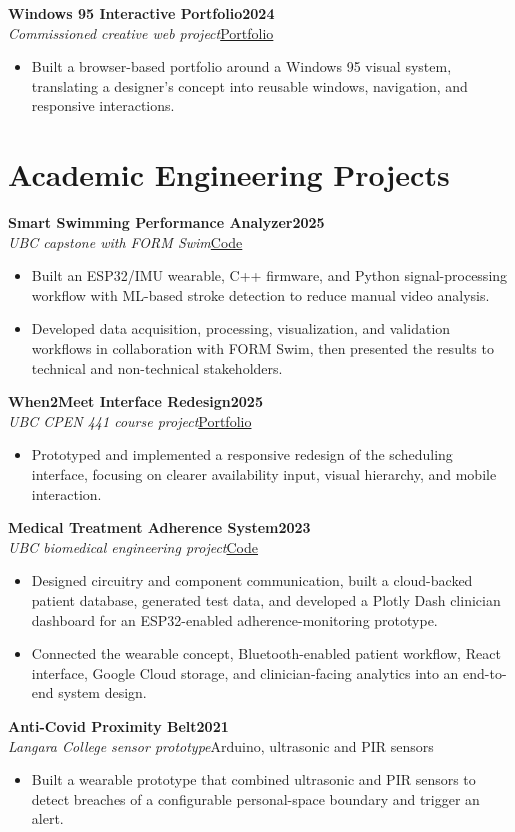 \documentclass[10pt,letterpaper]{article}
\newenvironment{bullets}{\begin{itemize}[topsep=0.03cm,parsep=0pt,partopsep=0pt,itemsep=0.02cm,leftmargin=11pt]}{\end{itemize}}
\newcommand{\project}[4]{\needspace{6\baselineskip}\textbf{#1}\hfill\textbf{#2}\\[-1pt]\textit{#3}\hfill #4\par}
\begin{document}
\project{Windows 95 Interactive Portfolio}{2024}{Commissioned creative web project}{\href{https://isadeh.com}{Portfolio}}
\begin{bullets}
\item Built a browser-based portfolio around a Windows 95 visual system, translating a designer's concept into reusable windows, navigation, and responsive interactions.
\end{bullets}

\section{Academic Engineering Projects}

\project{Smart Swimming Performance Analyzer}{2025}{UBC capstone with FORM Swim}{\href{https://github.com/IddoSadeh/form24}{Code}}
\begin{bullets}
\item Built an ESP32/IMU wearable, C++ firmware, and Python signal-processing workflow with ML-based stroke detection to reduce manual video analysis.
\item Developed data acquisition, processing, visualization, and validation workflows in collaboration with FORM Swim, then presented the results to technical and non-technical stakeholders.
\end{bullets}

\project{When2Meet Interface Redesign}{2025}{UBC CPEN 441 course project}{\href{https://isadeh.com}{Portfolio}}
\begin{bullets}
\item Prototyped and implemented a responsive redesign of the scheduling interface, focusing on clearer availability input, visual hierarchy, and mobile interaction.
\end{bullets}

\project{Medical Treatment Adherence System}{2023}{UBC biomedical engineering project}{\href{https://github.com/IddoSadeh/NasalDash}{Code}}
\begin{bullets}
\item Designed circuitry and component communication, built a cloud-backed patient database, generated test data, and developed a Plotly Dash clinician dashboard for an ESP32-enabled adherence-monitoring prototype.
\item Connected the wearable concept, Bluetooth-enabled patient workflow, React interface, Google Cloud storage, and clinician-facing analytics into an end-to-end system design.
\end{bullets}

\project{Anti-Covid Proximity Belt}{2021}{Langara College sensor prototype}{Arduino, ultrasonic and PIR sensors}
\begin{bullets}
\item Built a wearable prototype that combined ultrasonic and PIR sensors to detect breaches of a configurable personal-space boundary and trigger an alert.
\end{bullets}
\end{document}
